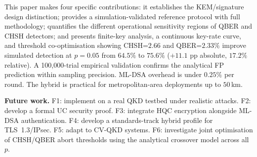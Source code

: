 \documentclass[conference]{IEEEtran}
\begin{document}
This paper makes four specific contributions: it establishes the KEM/signature design distinction; provides a simulation-validated reference protocol with full methodology; quantifies the different operational sensitivity regions of QBER and CHSH detectors; and presents finite-key analysis, a continuous key-rate curve, and threshold co-optimisation showing CHSH=$2.66$ and QBER=$2.33\%$ improve simulated detection at $p = 0.05$ from $64.5\%$ to $75.6\%$ ($+11.1$ pp absolute, $17.2\%$ relative). A 100{,}000-trial empirical validation confirms the analytical FP prediction within sampling precision. ML-DSA overhead is under $0.25\%$ per round. The hybrid is practical for metropolitan-area deployments up to $50$\,km.

\textbf{Future work.} F1: implement on a real QKD testbed under realistic attacks. F2: develop a formal UC security proof. F3: integrate HQC encryption alongside ML-DSA authentication. F4: develop a standards-track hybrid profile for TLS~1.3/IPsec. F5: adapt to CV-QKD systems. F6: investigate joint optimisation of CHSH/QBER abort thresholds using the analytical crossover model across all $p$.

\appendices
\end{document}
